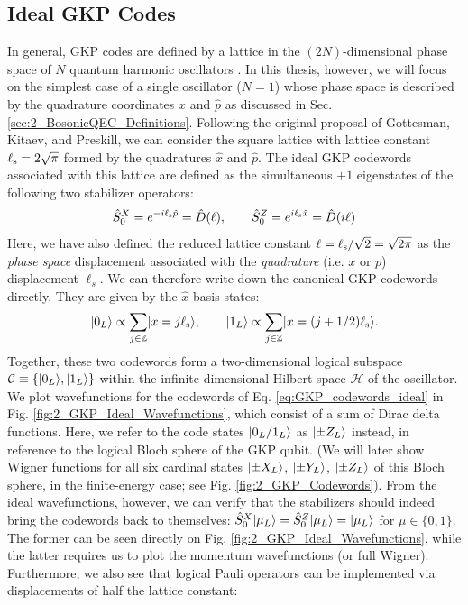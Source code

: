 \subsection{Ideal GKP Codes}
In general, GKP codes are defined by a lattice in the $(2N)$-dimensional phase space of $N$ quantum harmonic oscillators \cite{gottesman2001gkp, royer2022multimodegkp}. In this thesis, however, we will focus on the simplest case of a single oscillator ($N=1$) whose phase space is described by the quadrature coordinates $\hat{x}$ and $\hat{p}$ as discussed in Sec. \ref{sec:2_BosonicQEC_Definitions}. Following the original proposal of Gottesman, Kitaev, and Preskill, we can consider the square lattice with lattice constant $\ell_{\rm s} = 2\sqrt{\pi}$ formed by the quadratures $\hat{x}$ and $\hat{p}$. The ideal GKP codewords associated with this lattice are defined as the simultaneous $+1$ eigenstates of the following two stabilizer operators: 
\begin{equation}
    \hat{S}_0^X = e^{-i\ell_{\rm s}\hat{p}} = \hat{D}(\ell) , \qquad \hat{S}_0^Z = e^{i\ell_{\rm s}\hat{x}} = \hat{D}(i\ell)
\end{equation}
Here, we have also defined the reduced lattice constant $\ell = \ell_{\rm s}/\sqrt{2} = \sqrt{2\pi}$ as the \textit{phase space} displacement associated with the \textit{quadrature} (i.e. $x$ or $p$) displacement $\ell_s$. We can therefore write down the canonical GKP codewords directly. They are given by the $\hat{x}$ basis states:
\begin{equation}
    \lvert0_L\rangle \propto \sum_{j \in \mathbb{Z}} \lvert x = j\ell_{\rm s}\rangle, \qquad \lvert1_L\rangle \propto \sum_{j \in \mathbb{Z}} \lvert x = (j + 1/2)\ell_{\rm s}\rangle.
    \label{eq:GKP_codewords_ideal}
\end{equation}
Together, these two codewords form a two-dimensional logical subspace $\mathcal{C} \equiv \{\lvert0_L\rangle, \lvert1_L\rangle\}$ within the infinite-dimensional Hilbert space $\mathcal{H}$ of the oscillator. We plot wavefunctions for the codewords of Eq. \eqref{eq:GKP_codewords_ideal} in Fig. \ref{fig:2_GKP_Ideal_Wavefunctions}, which consist of a sum of Dirac delta functions. Here, we refer to the code states $\lvert0_L/1_L\rangle$ as $\lvert\pm Z_L\rangle$ instead, in reference to the logical Bloch sphere of the GKP qubit. (We will later show Wigner functions for all six cardinal states $\lvert\pm X_L\rangle$, $\lvert\pm Y_L\rangle$, $\lvert\pm Z_L\rangle$ of this Bloch sphere, in the finite-energy case; see Fig. \ref{fig:2_GKP_Codewords}). From the ideal wavefunctions, however, we can verify that the stabilizers should indeed bring the codewords back to themselves: $\hat{S}_0^X\lvert\mu_L\rangle = \hat{S}_0^Z\lvert\mu_L\rangle = \lvert\mu_L\rangle$ for $\mu\in\{0, 1\}$. The former can be seen directly on Fig. \ref{fig:2_GKP_Ideal_Wavefunctions}, while the latter requires us to plot the momentum wavefunctions (or full Wigner). Furthermore, we also see that logical Pauli operators can be implemented via displacements of half the lattice constant: 
